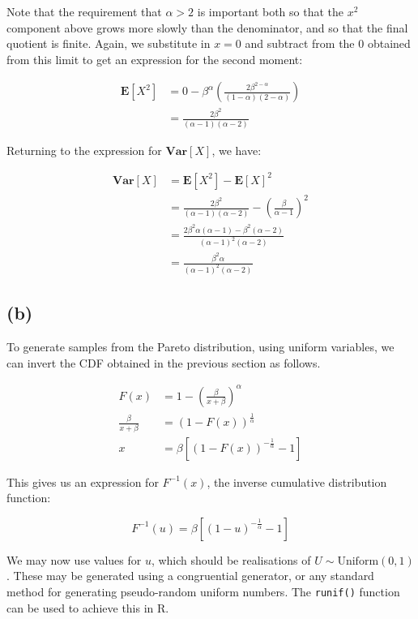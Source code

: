 \documentclass{article}
\begin{document}
Note that the requirement that $\alpha > 2$ is important both so that
the $x^2$ component above grows more slowly than the denominator, and
so that the final quotient is finite. Again, we substitute in $x = 0$
and subtract from the $0$ obtained from this limit to get an
expression for the second moment:

\begin{align*}
  \mathbf{E}\left[X^2\right] &= 0 - \beta^{\alpha} \left(
                               \frac{2 \beta^{2 - \alpha}}
                               {(1 - \alpha)(2 - \alpha)}
                               \right) \\
                             &= \frac{2 \beta^2}
                               {(\alpha - 1)(\alpha - 2)}
\end{align*}

Returning to the expression for $\mathbf{Var}\left[ X \right]$, we have:

\begin{align*}
  \mathbf{Var}\left[ X \right] &= \mathbf{E}\left[X^2\right]
                                 - {\mathbf{E}\left[X\right]}^2 \\
                               &= \frac{2 \beta^2}
                                 {(\alpha - 1)(\alpha - 2)}
                                 - {\left(
                                 \frac{\beta}{\alpha - 1}
                                 \right)}^2 \\
                               &= \frac{2 \beta^2 \alpha (\alpha - 1)
                                 - \beta^2 (\alpha - 2)}
                                 {{(\alpha - 1)}^2(\alpha - 2)} \\
                               &= \frac{\beta^2 \alpha}
                                 {{(\alpha - 1)}^2(\alpha - 2)}
\end{align*}

\subsection{(b)}

To generate samples from the Pareto distribution, using uniform
variables, we can invert the CDF obtained in the previous section as
follows.

\begin{align*}
  F(x) &= 1 - {\left( \frac{\beta}{x + \beta} \right)}^\alpha \\
  \frac{\beta}{x + \beta} &= {\left( 1 - F(x) \right)}^{\frac{1}{\alpha}} \\
                        x &= \beta \left[{ \left( 1 - F(x)
                            \right)}^{-\frac{1}{\alpha}} - 1 \right]
\end{align*}

This gives us an expression for $F^{-1}(x)$, the inverse cumulative
distribution function:

\[
  F^{-1}(u) = \beta \left[{ \left( 1 - u \right)}^{-\frac{1}{\alpha}}
    - 1 \right]
\]

We may now use values for $u$, which should be realisations of  $U
\sim \mathrm{Uniform}(0, 1)$. These may be generated using a
congruential generator, or any standard method for generating
pseudo-random uniform numbers. The \texttt{runif()} function can be
used to achieve this in R.
\end{document}
